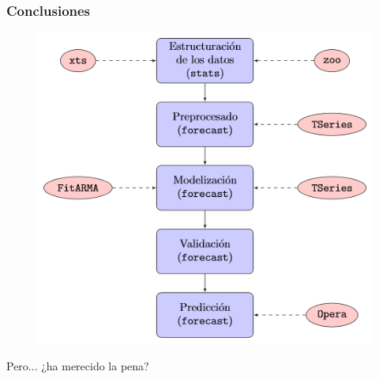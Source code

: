\documentclass[10pt,a4paper,twoside]{beamer}
\begin{document}
\begin{frame}
\frametitle{Conclusiones}

\begin{figure}
    \centering
    \centerline{\includegraphics[scale = 0.5]{Images/esquema-conclusiones.png}}
\end{figure}

\end{frame}


\begin{frame}

\begin{center}
\Huge{Pero... ¿ha merecido la pena?}
\end{center}

\end{frame}

\end{document}
